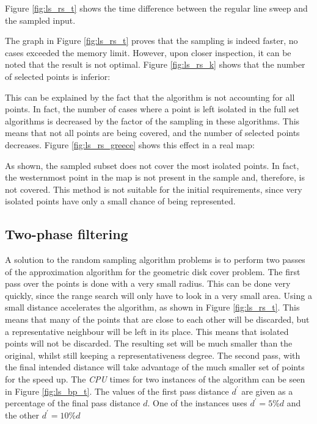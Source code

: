 Figure \ref{fig:ls_rs_t} shows the time difference between the regular line sweep and the sampled input.



The graph in Figure \ref{fig:ls_rs_t} proves that the sampling is indeed faster, no cases exceeded the memory limit. However, upon closer inspection, it can be noted that the result is not optimal. Figure \ref{fig:ls_rs_k} shows that the number of selected points is inferior:



This can be explained by the fact that the algorithm is not accounting for all points. In fact, the number of cases where a point is left isolated in the full set algorithms is decreased by the factor of the sampling in these algorithms. This means that not all points are being covered, and the number of selected points decreases. Figure \ref{fig:ls_rs_greece} shows this effect in a real map:



As shown, the sampled subset does not cover the most isolated points. In fact, the westernmost point in the map is not present in the sample and, therefore, is not covered. This method is not suitable for the initial requirements, since very isolated points have only a small chance of being represented.

\subsection{Two-phase filtering}
A solution to the random sampling algorithm problems is to perform two passes of the approximation algorithm for the geometric disk cover problem. The first pass over the points is done with a very small radius. This can be done very quickly, since the range search will only have to look in a very small area. Using a small distance accelerates the algorithm, as shown in Figure \ref{fig:ls_rs_t}. This means that many of the points that are close to each other will be discarded, but a representative neighbour will be left in its place. This means that isolated points will not be discarded. The resulting set will be much smaller than the original, whilst still keeping a representativeness degree. The second pass, with the final intended distance will take advantage of the much smaller set of points for the speed up. The \emph{CPU} times for two instances of the algorithm can be seen in Figure \ref{fig:ls_bp_t}. The values of the first pass distance $d^\prime$ are given as a percentage of the final pass distance $d$. One of the instances uses $d^\prime=5\%d$ and the other $d^\prime=10\%d$

